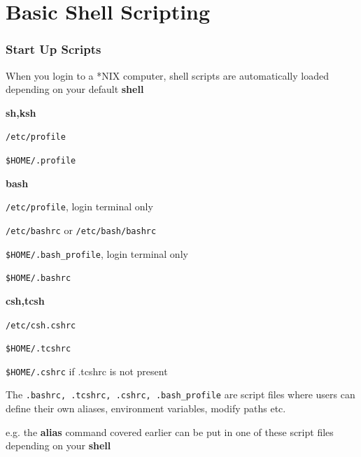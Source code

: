 \documentclass[c,compress,xcolor=svgnames]{beamer}
\begin{document}
\section{Basic Shell Scripting}
\begin{frame}
  \frametitle{\small Start Up Scripts}
  \begin{itemize}
    {\scriptsize
    \item When you login to a *NIX computer, shell scripts are automatically loaded depending on your default \textbf{\color{tigerspurple}shell}
    \item \textbf{\color{tigerspurple}sh,ksh}
    \begin{enumerate}
      {\scriptsize
        \item \texttt{\color{blue}/etc/profile}
        \item \texttt{\color{blue}\$HOME/.profile}
      }
    \end{enumerate}
    \item \textbf{\color{tigerspurple}bash}
    \begin{enumerate}
      {\scriptsize
        \item \texttt{\color{blue}/etc/profile}, login terminal only
        \item \texttt{\color{blue}/etc/bashrc} or \texttt{\color{blue}/etc/bash/bashrc}
        \item \texttt{\color{blue}\$HOME/.bash\_profile}, login terminal only
        \item \texttt{\color{blue}\$HOME/.bashrc}
      }
    \end{enumerate}
    \item \textbf{\color{tigerspurple}csh,tcsh}
    \begin{enumerate}
      {\scriptsize
        \item \texttt{\color{blue}/etc/csh.cshrc}
        \item \texttt{\color{blue}\$HOME/.tcshrc}
        \item \texttt{\color{blue}\$HOME/.cshrc} if .tcshrc is not present
      }
    \end{enumerate}
    \item The \texttt{\color{blue}.bashrc, .tcshrc, .cshrc, .bash\_profile} are script files where users can define their own aliases, environment variables, modify paths etc.
    \item e.g. the \textbf{\color{dkgreen}alias} command covered earlier can be put in one of these script files depending on your \textbf{\color{tigerspurple}shell}
    }
  \end{itemize}
\end{frame}
\end{document}
